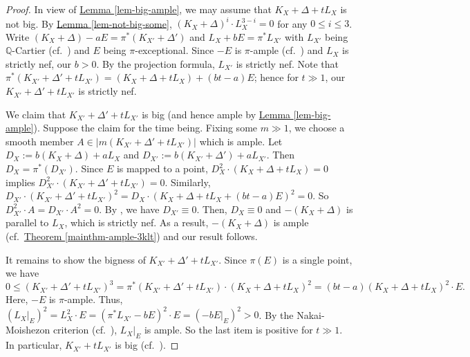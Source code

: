 \begin{proof}
In view of {\hyperref[lem-big-ample]{Lemma  \ref*{lem-big-ample}}}, we may assume that $K_X+\Delta+tL_X$ is not big.
By {\hyperref[lem-not-big-some]{Lemma  \ref*{lem-not-big-some}}}, $(K_X+\Delta)^i\cdot L_X^{3-i}=0$ for any $0\leqslant i\leqslant 3$.
Write $(K_X+\Delta)-aE=\pi^*(K_{X'}+\Delta')$ and $L_X+bE=\pi^*L_{X'}$ with $L_{X'}$ being  $\mathbb{Q}$-Cartier  (cf.~\cite[Theorem 3-2-1]{KMM87}) and $E$ being  $\pi$-exceptional. 
Since $-E$ is $\pi$-ample (cf.~\cite[Lemma 2.62]{KM98}) and $L_X$ is strictly nef, our $b>0$. 
By the projection formula, $L_{X'}$ is strictly nef.
Note that 
$\pi^*(K_{X'}+\Delta'+tL_{X'})=(K_X+\Delta+tL_X)+(bt-a)E$;  
hence for  $t\gg 1$, our $K_{X'}+\Delta'+tL_{X'}$ is strictly nef.

We claim that $K_{X'}+\Delta'+tL_{X'}$ is big (and hence ample by {\hyperref[lem-big-ample]{Lemma  \ref*{lem-big-ample}}}). 
Suppose the claim for the time being.
Fixing some $m\gg 1$, we choose a  smooth member $A\in |m(K_{X'}+\Delta'+tL_{X'})|$ which is ample.
Let $D_X:=b(K_X+\Delta)+aL_X$ and $D_{X'}:=b(K_{X'}+\Delta')+aL_{X'}$.
Then  $D_X=\pi^*(D_{X'})$.
Since $E$ is mapped to a point, $D_X^2\cdot(K_X+\Delta+tL_X)=0$ implies $D_{X'}^2\cdot(K_{X'}+\Delta'+tL_{X'})=0$.
Similarly, $D_{X'}\cdot (K_{X'}+\Delta'+tL_{X'})^2=D_X\cdot (K_X+\Delta+tL_X+(bt-a)E)^2=0$.  
So $D_{X'}^2\cdot A=D_{X'}\cdot  A^2=0$.
By \cite[Lemma 3.2]{Zha16}, we have $D_{X'}\equiv 0$. 
Then, $D_X\equiv0$ and   $-(K_X+\Delta)$ is parallel to $L_X$, which is strictly nef.
As a result, $-(K_X+\Delta)$ is ample (cf.~{\hyperref[mainthm-ample-3klt]{Theorem \ref*{mainthm-ample-3klt}}}) and our result follows.

It remains to show the bigness of $K_{X'}+\Delta'+tL_{X'}$.
Since $\pi(E)$ is  a single point, we have
$$0\leqslant(K_{X'}+\Delta'+tL_{X'})^3=\pi^*(K_{X'}+\Delta'+tL_{X'})\cdot (K_X+\Delta+tL_X)^2=(bt-a)(K_X+\Delta+tL_X)^2\cdot E.$$
Here, $-E$ is $\pi$-ample. 
Thus, $(L_X|_E)^2=L_X^2\cdot E=(\pi^*L_{X'}-bE)^2\cdot E=(-bE|_E)^2>0$.
By the  Nakai-Moishezon criterion (cf.~\cite[Theorem 1.37]{KM98}),  $L_X|_E$ is ample.
So the last item is positive for  $t\gg 1$.
In particular, $K_{X'}+tL_{X'}$ is big (cf.~\cite[Proposition 2.61]{KM98}).
\end{proof}


